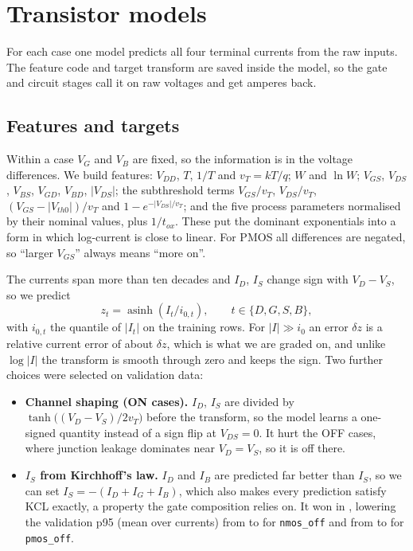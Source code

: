 \section{Transistor models}\label{sec:models}

For each case one model predicts all four terminal currents from the raw inputs. The feature code
and target transform are saved inside the model, so the gate and circuit stages call it on raw
voltages and get amperes back.

\subsection{Features and targets}
Within a case $V_G$ and $V_B$ are fixed, so the information is in the voltage differences. We
build \NumFeatures{} features: $V_{DD}$, $T$, $1/T$ and $v_T=kT/q$; $W$ and $\ln W$; $V_{GS}$,
$V_{DS}$, $V_{BS}$, $V_{GD}$, $V_{BD}$, $|V_{DS}|$; the subthreshold terms $V_{GS}/v_T$,
$V_{DS}/v_T$, $(V_{GS}-|V_{th0}|)/v_T$ and $1-e^{-|V_{DS}|/v_T}$; and the five process parameters
normalised by their nominal values, plus $1/t_{ox}$. These put the dominant exponentials into a
form in which log-current is close to linear. For PMOS all differences are negated, so ``larger
$V_{GS}$'' always means ``more on''.

The currents span more than ten decades and $I_D$, $I_S$ change sign with $V_D-V_S$, so we predict
\begin{equation}
  z_t = \operatorname{asinh}(I_t / i_{0,t}), \qquad t\in\{D,G,S,B\},
\end{equation}
with $i_{0,t}$ the \AsinhQuantile{} quantile of $|I_t|$ on the training rows. For $|I|\gg i_0$ an
error $\delta z$ is a relative current error of about $\delta z$, which is what we are graded on,
and unlike $\log|I|$ the transform is smooth through zero and keeps the sign. Two further choices
were selected on validation data:
\begin{itemize}
  \item \textbf{Channel shaping (ON cases).} $I_D$, $I_S$ are divided by
        $\tanh\!\bigl((V_D-V_S)/2v_T\bigr)$ before the transform, so the model learns a one-signed
        quantity instead of a sign flip at $V_{DS}=0$. It hurt the OFF cases, where junction
        leakage dominates near $V_D=V_S$, so it is off there.
  \item \textbf{$I_S$ from Kirchhoff's law.} $I_D$ and $I_B$ are predicted far better than $I_S$,
        so we can set $I_S=-(I_D+I_G+I_B)$, which also makes every prediction satisfy KCL
        exactly, a property the gate composition relies on. It won in \KclCases, lowering the
        validation p95 (mean over currents) from \KclDirectPninetyfiveNmosOff{} to
        \KclDerivedPninetyfiveNmosOff{} for \texttt{nmos\_off} and from
        \KclDirectPninetyfivePmosOff{} to \KclDerivedPninetyfivePmosOff{} for \texttt{pmos\_off}.
\end{itemize}

